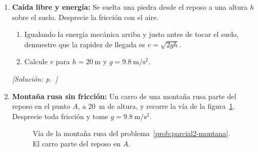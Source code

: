 \begin{enumerate}[label=\textbf{P\arabic*.}, ref=P\arabic*, leftmargin=*]

    \item\label{prob:parcial2-caida} \textbf{Caída libre y energía:}
    Se suelta una piedra desde el reposo a una altura $h$ sobre el suelo.
    Desprecie la fricción con el aire.
    \begin{enumerate}
        \item Igualando la energía mecánica arriba y justo antes de tocar el
        suelo, demuestre que la rapidez de llegada es $v = \sqrt{2gh}$.
        \item Calcule $v$ para $h = \SI{20}{\meter}$ y
        $g = \SI{9.8}{\meter\per\second\squared}$.
    \end{enumerate}
    \hfill\textit{[Solución: p.~\pageref{sol:parcial2-caida}]}

    \item\label{prob:parcial2-montana} \textbf{Montaña rusa sin fricción:}
    Un carro de una montaña rusa parte del reposo en el punto $A$, a
    \SI{20}{\meter} de altura, y recorre la vía de la
    figura~\ref{fig:parcial2-montana}. Desprecie toda fricción y tome
    $g = \SI{9.8}{\meter\per\second\squared}$.

    \begin{figure}[htbp]
        \centering
        \caption{Vía de la montaña rusa del problema~\ref{prob:parcial2-montana}.
        El carro parte del reposo en $A$.}
        \label{fig:parcial2-montana}
    \end{figure}


\end{enumerate}
